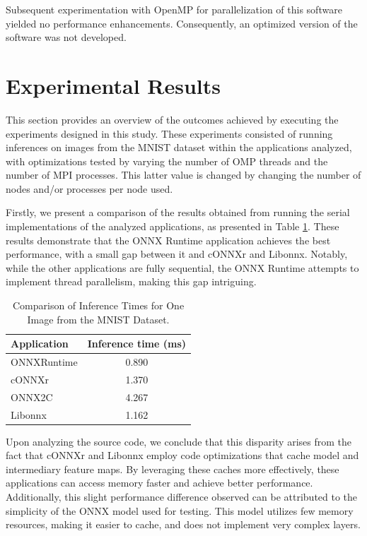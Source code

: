 \documentclass[fleqn,10pt]{olplainarticle}
\begin{document}
Subsequent experimentation with OpenMP for parallelization of this software yielded no performance enhancements. Consequently, an optimized version of the software was not developed.

\section{Experimental Results}
This section provides an overview of the outcomes achieved by executing the experiments designed in this study. These experiments consisted of running inferences on images from the MNIST dataset within the applications analyzed, with optimizations tested by varying the number of OMP threads and the number of MPI processes. This latter value is changed by changing the number of nodes and/or processes per node used.

Firstly, we present a comparison of the results obtained from running the serial implementations of the analyzed applications, as presented in Table \ref{tab:all_serial}. These results demonstrate that the ONNX Runtime application achieves the best performance, with a small gap between it and cONNXr and Libonnx. Notably, while the other applications are fully sequential, the ONNX Runtime attempts to implement thread parallelism, making this gap intriguing. 

\begin{table}[!ht]
    \centering
    \begin{tabular}{|l|c|}
    \hline
    \textbf{Application} & \textbf{Inference time (ms)} \\ \hline
    ONNXRuntime          & 0.890                        \\ \hline
    cONNXr               & 1.370                        \\ \hline
    ONNX2C               & 4.267                        \\ \hline
    Libonnx              & 1.162                        \\ \hline
    \end{tabular}
    \caption{Comparison of Inference Times for One Image from the MNIST Dataset.}
    \label{tab:all_serial}
\end{table}

Upon analyzing the source code, we conclude that this disparity arises from the fact that cONNXr and Libonnx employ code optimizations that cache model and intermediary feature maps. By leveraging these caches more effectively, these applications can access memory faster and achieve better performance. Additionally, this slight performance difference observed can be attributed to the simplicity of the ONNX model used for testing. This model utilizes few memory resources, making it easier to cache, and does not implement very complex layers.
\end{document}
